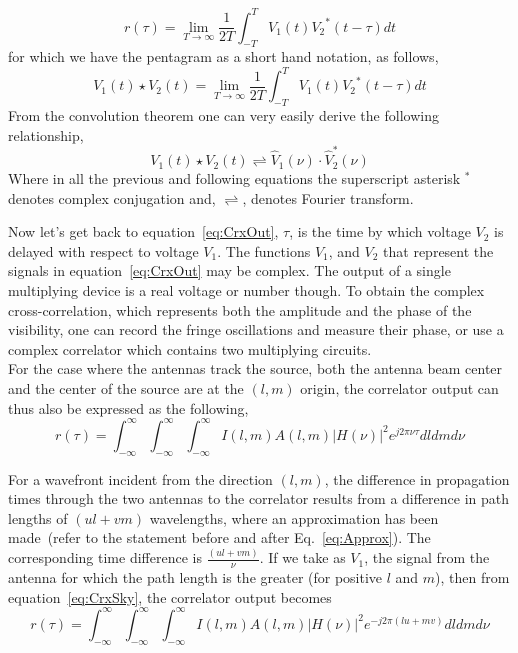\begin{equation}
\label{eq:CrxOut}
r(\tau) = \lim_{T \to \infty}\frac{1}{2T}\int^{T}_{-T}{V_1(t){V_2}^{*}(t-\tau)dt}
\end{equation}
for which we have the pentagram as a short hand notation, as follows,
\begin{equation}
V_1(t)\star{V_2(t)} = \lim_{T \to \infty}\frac{1}{2T}\int^{T}_{-T}{V_1(t){V_2}^{*}(t-\tau)dt}
\end{equation}
From the convolution theorem one can very easily derive the following relationship,
\begin{equation}
V_1(t)\star{V_2(t)} \rightleftharpoons {\widehat{V}_1(\nu)\cdot{\widehat{V}^{*}_2(\nu)}}
\end{equation}
Where in all the previous and following equations the superscript asterisk{ }$^*$ denotes complex conjugation and, $\rightleftharpoons$, denotes Fourier transform.

Now let's get back to equation~\ref{eq:CrxOut}, $\tau$, is the time by which voltage $V_2$ is delayed with respect to voltage $V_1$. The functions $V_1$, and $V_2$ that represent the signals in equation~\ref{eq:CrxOut} may be complex. The output of a single multiplying device is a real voltage or number though. To obtain the complex cross-correlation, which represents both the amplitude and the phase of the visibility, one can record the fringe oscillations and measure their phase, or use a complex correlator which contains two multiplying circuits.\\

For the case where the antennas track the source, both the antenna beam center and the center of the source are at the $(l, m)$ origin, the correlator output can thus also be expressed as the following,
\begin{equation}
\label{eq:CrxSky}
r(\tau) = \int^{\infty}_{-\infty}\int^{\infty}_{-\infty}\int^{\infty}_{-\infty}{I(l,m)A(l,m){|H(\nu)|^2}e^{j2\pi{\nu}{\tau}}dldmd\nu}
\end{equation}

For a wavefront incident from the direction $(l, m)$, the difference in propagation times through the two antennas to the correlator results from a difference in path lengths of $(ul + vm)$ wavelengths, where an approximation has been made~(refer to the statement before and after Eq.~\ref{eq:Approx}). The corresponding time difference is $\frac{(ul + vm)}{\nu}$.
If we take as $V_1$, the signal from the antenna for which the path length is the greater (for positive $l$ and $m$), then from equation~\ref{eq:CrxSky}, the correlator output becomes
\begin{equation}
\label{eq:CrxSkylm}
r(\tau) = \int^{\infty}_{-\infty}\int^{\infty}_{-\infty}\int^{\infty}_{-\infty}{I(l,m)A(l,m){|H(\nu)|^2}e^{-j2\pi(lu + mv)}dldmd\nu}
\end{equation}

